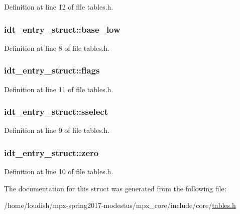 Definition at line 12 of file tables.\+h.

\subsubsection[{\texorpdfstring{base\+\_\+low}{base_low}}]{ idt\+\_\+entry\+\_\+struct\+::base\+\_\+low}\hypertarget{structidt__entry__struct_aefa75d6bfe07f1f544393b4dbccb3e76}{}\label{structidt__entry__struct_aefa75d6bfe07f1f544393b4dbccb3e76}


Definition at line 8 of file tables.\+h.

\subsubsection[{\texorpdfstring{flags}{flags}}]{ idt\+\_\+entry\+\_\+struct\+::flags}\hypertarget{structidt__entry__struct_a46c92bd8f07d5ff4e379a07b293c46af}{}\label{structidt__entry__struct_a46c92bd8f07d5ff4e379a07b293c46af}


Definition at line 11 of file tables.\+h.

\subsubsection[{\texorpdfstring{sselect}{sselect}}]{ idt\+\_\+entry\+\_\+struct\+::sselect}\hypertarget{structidt__entry__struct_a85254c7df6a612f4a4b3bb470ff3370c}{}\label{structidt__entry__struct_a85254c7df6a612f4a4b3bb470ff3370c}


Definition at line 9 of file tables.\+h.

\subsubsection[{\texorpdfstring{zero}{zero}}]{ idt\+\_\+entry\+\_\+struct\+::zero}\hypertarget{structidt__entry__struct_a0d33c8509ae77d42e680d8d11b4c8035}{}\label{structidt__entry__struct_a0d33c8509ae77d42e680d8d11b4c8035}


Definition at line 10 of file tables.\+h.



The documentation for this struct was generated from the following file\+:\begin{DoxyCompactItemize}
\item 
/home/loudish/mpx-\/spring2017-\/modestus/mpx\+\_\+core/include/core/\hyperlink{tables_8h}{tables.\+h}\end{DoxyCompactItemize}

